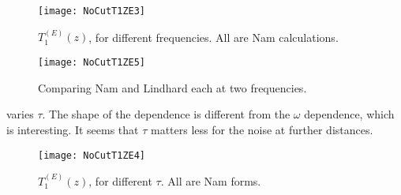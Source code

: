 \documentclass[../main.tex]{subfiles}
\begin{document}
	\begin{figure}[htp]
		\centering
		\texttt{[image: NoCutT1ZE3]}
		\caption{
			$T_{1}^{(E)}(z)$, for different frequencies.
			All are Nam calculations.
		} \label{fig:t3ez}
	\end{figure}

	\begin{figure}[htp]
		\centering
		\texttt{[image: NoCutT1ZE5]}
		\caption{
			Comparing Nam and Lindhard each at two frequencies.
		} \label{fig:t5ez}
	\end{figure}

	 varies $\tau$.
	The shape of the dependence is different from the $\omega$ dependence, which is interesting.
	It seems that $\tau$ matters less for the noise at further distances.

	\begin{figure}[htp]
		\centering
		\texttt{[image: NoCutT1ZE4]}
		\caption{
			$T_{1}^{(E)}(z)$, for different $\tau$.
			All are Nam forms.
		} \label{fig:t4ez}
	\end{figure}
\end{document}
